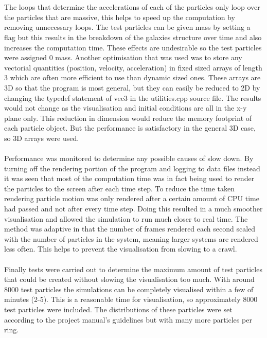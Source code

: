 \documentclass[10pt,a4paper]{article}
\begin{document}
\\
\\
The loops that determine the accelerations of each of the particles only loop over the particles that are massive, this helps to speed up the computation by removing unnecessary loops. The test particles can be given mass by setting a flag but this results in the breakdown of the galaxies structure over time and also increases the computation time. These effects are undesirable so the test particles were assigned 0 mass. Another optimisation that was used was to store any vectorial quantities (position, velocity, acceleration) in fixed sized arrays of length 3 which are often more efficient to use than dynamic sized ones. These arrays are 3D so that the program is most general, but they can easily be reduced to 2D by changing the typedef statement of vec3 in the utilities.cpp source file. The results would not change as the visualisation and initial conditions are all in the x-y plane only. This reduction in dimension would reduce the memory footprint of each particle object. But the performance is satisfactory in the general 3D case, so 3D arrays were used.
\\
\\
Performance was monitored to determine any possible causes of slow down. By turning off the rendering portion of the program and logging to data files instead it was seen that most of the computation time was in fact being used to render the particles to the screen after each time step. To reduce the time taken rendering particle motion was only rendered after a certain amount of CPU time had passed and not after every time step. Doing this resulted in a much smoother visualisation and allowed the simulation to run much closer to real time. The method  was adaptive in that the number of frames rendered each second scaled with the number of particles in the system, meaning larger systems are rendered less often. This helps to prevent the visualisation from slowing to a crawl.
\\
\\
Finally tests were carried out to determine the maximum amount of test particles that could be created without slowing the visualisation too much. With around 8000 test particles the simulations can be completely visualised within a few of minutes (2-5). This is a reasonable time for visualisation, so approximately 8000 test particles  were included. The distributions of these particles were set according to the project manual's guidelines but with many more particles per ring.
\end{document}

